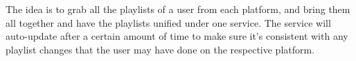 The idea is to grab all the playlists of a user from each platform, and bring them all together and have the playlists unified under one service. The service will auto-update after a certain amount of time to make sure it's consistent with any playlist changes that the user may have done on the respective platform.
